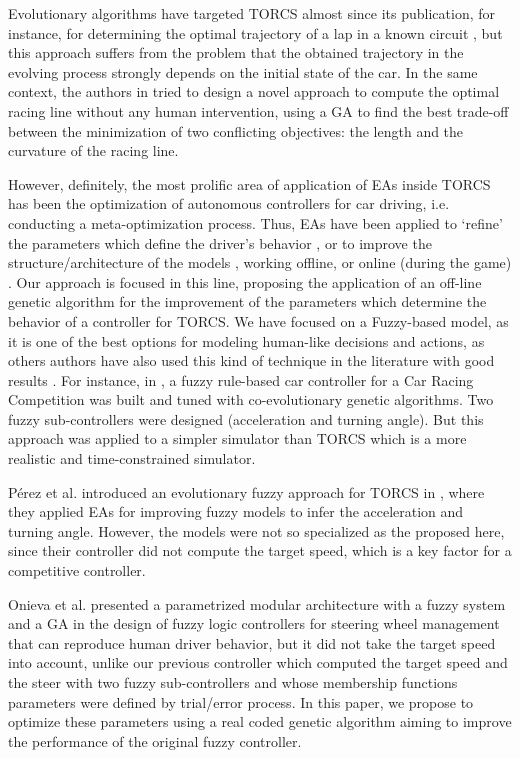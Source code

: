 \documentclass[conference]{IEEEtran}
\begin{document}
Evolutionary algorithms have targeted TORCS almost since its
publication, for instance, for determining the
optimal trajectory of a lap in a known circuit \cite{drivingGA2008},
but this approach suffers from the problem that the obtained
trajectory in the evolving process strongly depends on the initial
state of the car.  
In the same context, the authors in \cite{GaRaceLine2010} tried to design a novel approach to compute the optimal racing line without any human intervention, using a GA to find the best trade-off between
the minimization of two conflicting objectives: the length and
the curvature of the racing line.

However, definitely, the most prolific area of application of EAs
inside TORCS has been the optimization of autonomous controllers for
car driving, i.e. conducting a meta-optimization process. 
Thus, EAs have been applied to `refine' the parameters which define
the driver's behavior \cite{ButzCMAES09,SAES2012}, or to improve the
structure/architecture of the models \cite{evol,neurone}, working
offline, or online (during the game)
\cite{TanOnline08,Cardamone_Online_NN}.
Our approach is focused in this line, proposing the application of an off-line genetic algorithm for the improvement of the parameters which determine the behavior of a controller for TORCS. We have focused on a Fuzzy-based model, as it is one of the best options for modeling human-like decisions and actions, as others authors have also used this kind of technique in the literature with good results \cite{torcs2012}. 
For instance, in \cite{Guadarrama2008}, a fuzzy rule-based car controller for a Car Racing Competition was built and tuned with co-evolutionary genetic algorithms. Two fuzzy sub-controllers were designed (acceleration and turning angle). %
But this approach was applied to a simpler simulator than TORCS which is a more realistic and time-constrained simulator. 

Pérez et al. introduced an evolutionary fuzzy approach for TORCS in \cite{PerezEvolvingFuzzy09}, where they applied EAs for improving fuzzy models to infer the acceleration and turning angle. However, the models were not so specialized as the proposed here, since their controller did not compute the target speed, which is a key factor for a competitive controller. 

Onieva et al. \cite{LFAG} presented a parametrized modular architecture with a fuzzy system and a GA in the design of fuzzy logic controllers for steering wheel management that can reproduce human driver behavior, but it did not take the target speed into account, unlike our previous controller \cite{evo17} which computed the target speed and the steer with two fuzzy sub-controllers and whose membership functions parameters were defined by trial/error process.
In this paper, we propose to optimize these parameters using a real coded genetic algorithm aiming to improve the performance of the original fuzzy controller. %
\end{document}
